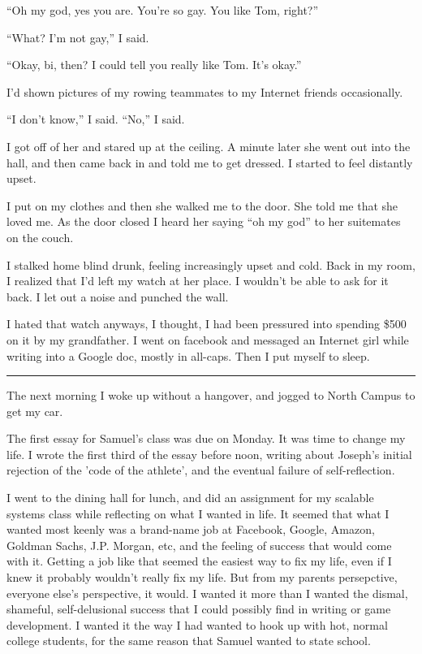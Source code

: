 ``Oh my god, yes you are.  You're so gay.  You like Tom, right?''

``What?  I'm not gay,'' I said.

``Okay, bi, then?  I could tell you really like Tom.  It's okay.''

I'd shown pictures of my rowing teammates to my Internet friends occasionally.

``I don't know,'' I said.  ``No,'' I said.

I got off of her and stared up at the ceiling.  A minute later she went out into
the hall, and then came back in and told me to get dressed.  I started to feel
distantly upset.

I put on my clothes and then she walked me to the door.  She told me that she
loved me.  As the door closed I heard her saying ``oh my god'' to her suitemates
on the couch.

I stalked home blind drunk, feeling increasingly upset and cold.  Back in my
room, I realized that I'd left my watch at her place.  I wouldn't be able to ask
for it back.  I let out a noise and punched the wall. 

I hated that watch anyways, I thought, I had been pressured into spending \$500
on it by my grandfather.  I went on facebook and messaged an Internet girl while
writing into a Google doc, mostly in all-caps.  Then I put myself to sleep.

\plainfancybreak{12pt}{2}{* * *}

The next morning I woke up without a hangover, and jogged to North Campus to get
my car.  

The first essay for Samuel's class was due on Monday.  It was time to change my
life.  I wrote the first third of the essay before noon, writing about Joseph's
initial rejection of the 'code of the athlete', and the eventual failure of
self-reflection.

I went to the dining hall for lunch, and did an assignment for my scalable
systems class while reflecting on what I wanted in life.  It seemed that what I
wanted most keenly was a brand-name job at Facebook, Google, Amazon, Goldman
Sachs, J.P.  Morgan, etc, and the feeling of success that would come with it.
Getting a job like that seemed the easiest way to fix my life, even if I knew it
probably wouldn't really fix my life.  But from my parents persepctive, everyone
else's perspective, it would.  I wanted it more than I wanted the dismal,
shameful, self-delusional success that I could possibly find in writing or game
development.  I wanted it the way I had wanted to hook up with hot, normal
college students, for the same reason that Samuel wanted to state school. 

